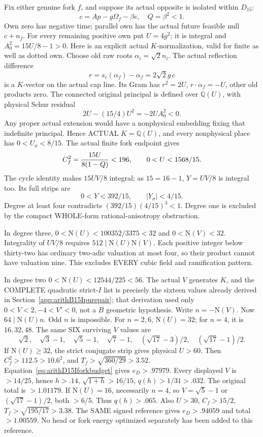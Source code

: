 Fix either genuine fork \(f\), and suppose its actual
opposite is isolated within \(D_{15}\):
\[
                  c=Ap-g\Omega_f-\beta e,\quad Q=\beta^2<1.
\]
Own zero has negative time; parallel own has
the actual future feasible null \(c+n_f\).
For every remaining positive own put \(U=4g^2\);
it is integral and
\(A_0^2=15U/8-1>0\).
Here is an explicit actual \(K\)-normalization,
valid for finite as well as dotted own.
Choose old raw roots \(\alpha_i=\sqrt2n_i\).
The actual reflection difference
\[
                       r=s_c(\alpha_f)-\alpha_f=2\sqrt2g\,c
\]
is a \(K\)-vector on the actual cap line.
Its Gram has
\(r^2=2U\), \(r\cdot\alpha_f=-U\), other old products zero.
The connected original principal is defined over
\(\mathbb Q(U)\), with physical Schur residual
\[
                     2U-(15/4)U^2=-2UA_0^2<0.
\]
Any proper actual extension would have a nonphysical
embedding fixing that indefinite principal.
Hence ACTUAL \(K=\mathbb Q(U)\), and every nonphysical
place has \(0<U_\sigma<8/15\).
The actual finite fork endpoint gives
\[
              C_f^2={15U\over8(1-Q)}<196,\qquad
              0<U<1568/15 .
\]
The cycle identity makes \(15UV/8\) integral;
as \(15=16-1\), \(Y=UV/8\) is integral too.
Its full strips are
\[
                 0<Y<392/15,\qquad |Y_\sigma|<4/15.
\]
Degree at least four contradicts
\((392/15)(4/15)^3<1\).
Degree one is excluded by the compact WHOLE-form
rational-anisotropy obstruction.

In degree three,
\(0<\mathrm N(U)<100352/3375<32\) and
\(0<\mathrm N(V)<32\).
Integrality of \(UV/8\) requires
\(512\mid\mathrm N(U)\mathrm N(V)\).
Each positive integer below thirty-two has ordinary
two-adic valuation at most four, so their product
cannot have valuation nine.
This excludes EVERY cubic field and ramification pattern.

In degree two \(0<\mathrm N(U)<12544/225<56\).
The actual \(V\) generates \(K\), and the COMPLETE
quadratic strict-\(I\) list is precisely the sixteen
values already derived in
Section~\ref{app:arithB15Ipurepair};
that derivation used only \(0<V<2,-4<V'<0\),
not a \(B\) geometric hypothesis.
Write \(n=-\mathrm N(V)\).
Now \(64\mid\mathrm N(U)n\).
Odd \(n\) is impossible.
For \(n=2,6\), \(\mathrm N(U)=32\);
for \(n=4\), it is \(16,32,48\).
The same SIX surviving \(V\) values are
\[
 \sqrt2,\quad\sqrt3-1,\quad\sqrt5-1,\quad\sqrt7-1,\quad
 (\sqrt{17}-3)/2,\quad(\sqrt{17}-1)/2.
\]
If \(\mathrm N(U)\ge32\), the strict conjugate strip
gives physical \(U>60\).
Then \(C_f^2>112.5>10.6^2\), and
\(T_f>\sqrt{360/29}>3.52\).
Equation~\eqref{eq:arithD15Iforkbudget} gives
\(e_D>.97979\).
Every displayed \(V\) is \(>14/25\), hence \(h>.14\),
\(\sqrt{1+h}>16/15\), \(q(h)>1/31>.032\).
The original total is \(>1.01179\).
If \(\mathrm N(U)=16\), necessarily \(n=4\),
so \(V=\sqrt5-1\) or \((\sqrt{17}-1)/2\),
both \(>6/5\).
Thus \(q(h)>.065\).
Also \(U>30\), \(C_f>15/2\),
\(T_f>\sqrt{195/17}>3.38\).
The SAME signed reference gives \(e_D>.94059\)
and total \(>1.00559\).
No head or fork energy optimized separately has
been added to this reference.

